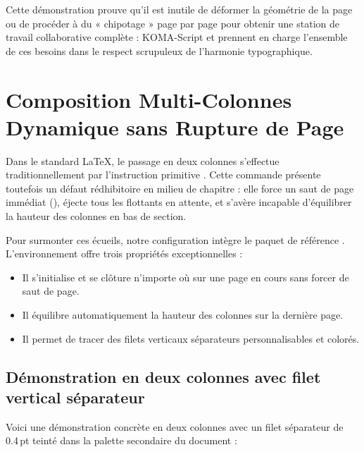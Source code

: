 Cette démonstration prouve qu'il est inutile de déformer la géométrie de la page
ou de procéder à du « chipotage » page par page pour obtenir une station de travail collaborative complète :
KOMA-Script et  prennent en charge l'ensemble de ces besoins
dans le respect scrupuleux de l'harmonie typographique.

\activerStyleStandard

\section{Composition Multi-Colonnes Dynamique sans Rupture de Page}
\label{sec:demo-multicol}

Dans le standard \LaTeX{}, le passage en deux colonnes s'effectue traditionnellement
par l'instruction primitive .
Cette commande présente toutefois un défaut rédhibitoire en milieu de chapitre :
elle force un saut de page immédiat (),
éjecte tous les flottants en attente,
et s'avère incapable d'équilibrer la hauteur des colonnes en bas de section.

Pour surmonter ces écueils, notre configuration intègre le paquet de référence .
L'environnement  offre trois propriétés exceptionnelles :
\begin{itemize}
  \item Il s'initialise et se clôture n'importe où sur une page en cours sans forcer de saut de page.
  \item Il équilibre automatiquement la hauteur des colonnes sur la dernière page.
  \item Il permet de tracer des filets verticaux séparateurs personnalisables et colorés.
\end{itemize}

\subsection{Démonstration en deux colonnes avec filet vertical séparateur}

Voici une démonstration concrète en deux colonnes avec un filet séparateur
de 0.4\,pt teinté dans la palette secondaire du document :

\setlength{\columnseprule}{0.4pt}
\renewcommand{\columnseprulecolor}{\color{ThesisSecondary!40}}
\setlength{\columnsep}{20pt}


